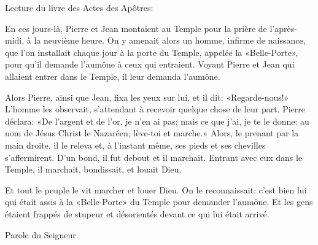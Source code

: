 \indent Lecture du livre des Actes des Apôtres:

En ces jours-là, Pierre et Jean montaient au Temple pour la prière de l’après-midi, à la neuvième heure. On y amenait alors un homme, infirme de naissance, que l’on installait chaque jour à la porte du Temple, appelée la «Belle-Porte», pour qu’il demande l’aumône à ceux qui entraient. Voyant Pierre et Jean qui allaient entrer dans le Temple, il leur demanda l’aumône.

Alors Pierre, ainsi que Jean, fixa les yeux sur lui, et il dit: «Regarde-nous!» L’homme les observait, s’attendant à recevoir quelque chose de leur part. Pierre déclara: «De l’argent et de l’or, je n’en ai pas; mais ce que j’ai, je te le donne: au nom de Jésus Christ le Nazaréen, lève-toi et marche.» Alors, le prenant par la main droite, il le releva et, à l’instant même, ses pieds et ses chevilles s’affermirent. D’un bond, il fut debout et il marchait. Entrant avec eux dans le Temple, il marchait, bondissait, et louait Dieu.

Et tout le peuple le vit marcher et louer Dieu. On le reconnaissait: c’est bien lui qui était assis à la «Belle-Porte» du Temple pour demander l’aumône. Et les gens étaient frappés de stupeur et désorientés devant ce qui lui était arrivé.

Parole du Seigneur.